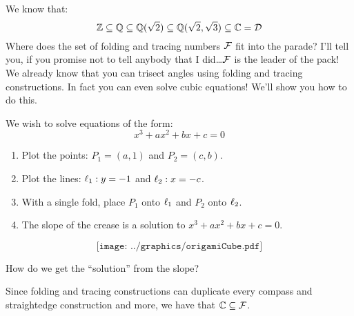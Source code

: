 We know that:
\[
\mathbb Z \subseteq \mathbb Q \subseteq \mathbb Q(\sqrt{2}) \subseteq \mathbb Q(\sqrt{2},\sqrt{3}) \subseteq \mathbb C = \mathcal D
\]
Where does the set of folding and tracing numbers $\mathcal F$ fit into the parade? I'll
tell you, if you promise not to tell anybody that I did\dots $\mathcal F$ is
the leader of the pack! We already know that you can trisect angles
using folding and tracing constructions. In fact you can even solve cubic
equations! We'll show you how to do this.

\begin{construction} We wish to solve equations of the form:
\[
x^3 + ax^2 + bx + c = 0
\]
\begin{enumerate}
\item Plot the points: $P_1 = (a,1)$ and $P_2 = (c,b)$.
\item Plot the lines: $\ell_1: y = -1$ and $\ell_2: x= -c$.
\item With a single fold, place $P_1$ onto $\ell_1$ and $P_2$ onto $\ell_2$.
\item The slope of the crease is a solution to $x^3 + ax^2 + bx + c =
  0$.
\end{enumerate}
\[
\texttt{[image: ../graphics/origamiCube.pdf]}
\]
\end{construction}

\begin{question} How do we get the ``solution'' from the slope?
\end{question}
\QM

Since folding and tracing constructions can duplicate every compass and
straightedge construction and more, we have that $\mathbb C \subseteq \mathcal F$.


